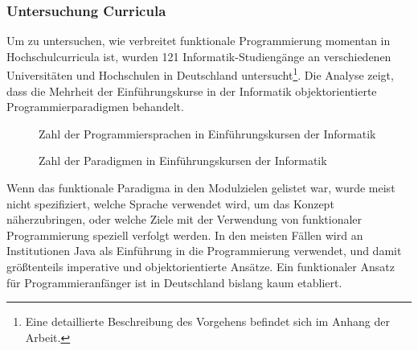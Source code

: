 \subsubsection{Untersuchung Curricula}\label{sec:curriculares}
Um zu untersuchen, wie verbreitet funktionale Programmierung momentan in Hochschulcurricula ist, wurden 121 Informatik-Studiengänge an verschiedenen Universitäten und Hochschulen in Deutschland untersucht\footnote{Eine detaillierte Beschreibung des Vorgehens befindet sich im Anhang der Arbeit.}.
Die Analyse zeigt, dass die Mehrheit der Einführungskurse in der Informatik objektorientierte Programmierparadigmen behandelt.

\begin{figure}[H]
    \centering
    
    \caption{Zahl der Programmiersprachen in Einführungskursen der Informatik}
\end{figure}

\begin{figure}[H]
    \centering
    
    \caption{Zahl der Paradigmen in Einführungskursen der Informatik}
\end{figure}

Wenn das funktionale Paradigma in den Modulzielen gelistet war, wurde meist nicht spezifiziert, welche Sprache verwendet wird, um das Konzept näherzubringen, oder welche Ziele mit der Verwendung von funktionaler Programmierung speziell verfolgt werden.
In den meisten Fällen wird an Institutionen Java als Einführung in die Programmierung verwendet, und damit größtenteils imperative und objektorientierte Ansätze.
Ein funktionaler Ansatz für Programmieranfänger ist in Deutschland bislang kaum etabliert.